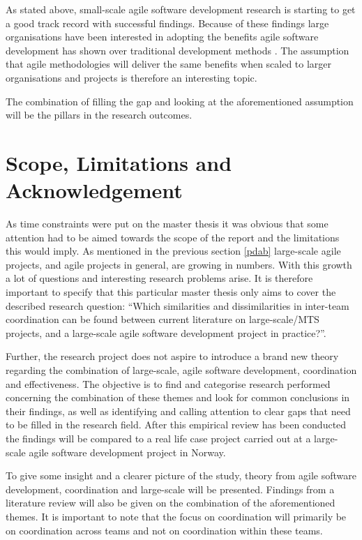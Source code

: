 As stated above, small-scale agile software development research is starting to get a good track record with successful findings. Because of these findings large organisations have been interested in adopting the benefits agile software development has shown over traditional development methods \cite{Com2013, Vlietland2015, Agerfalk2006, Paasivaara2012}. The assumption that agile methodologies will deliver the same benefits when scaled to larger organisations and projects is therefore an interesting topic.

The combination of filling the gap and looking at the aforementioned assumption will be the pillars in the research outcomes.

\section{Scope, Limitations and Acknowledgement}

As time constraints were put on the master thesis it was obvious that some attention had to be aimed towards the scope of the report and the limitations this would imply. As mentioned in the previous section \ref{pdab} large-scale agile projects, and agile projects in general, are growing in numbers. With this growth a lot of questions and interesting research problems arise. It is therefore important to specify that this particular master thesis only aims to cover the described research question: ``Which similarities and dissimilarities in inter-team coordination can be found between current literature on large-scale/MTS projects, and a large-scale agile software development project in practice?''.

Further, the research project does not aspire to introduce a brand new theory regarding the combination of large-scale, agile software development, coordination and effectiveness. The objective is to find and categorise research performed concerning the combination of these themes and look for common conclusions in their findings, as well as identifying and calling attention to clear gaps that need to be filled in the research field. After this empirical review has been conducted the findings will be compared to a real life case project carried out at a large-scale agile software development project in Norway.

To give some insight and a clearer picture of the study, theory from agile software development, coordination and large-scale will be presented. Findings from a literature review will also be given on the combination of the aforementioned themes. It is important to note that the focus on coordination will primarily be on coordination across teams and not on coordination within these teams.

